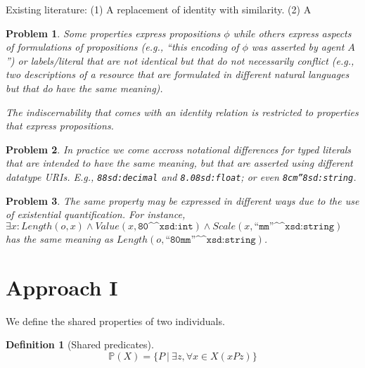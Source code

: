 \documentclass[11pt,a4paper,notitlepage,onecolumn,twoside]{article}
\newtheorem{definition}{Definition}
\newtheorem{problem}{Problem}
\begin{document}
Existing literature:
(1) A replacement of identity with similarity.
(2) A 

\begin{problem}
Some properties express propositions $\phi$ while others express aspects of formulations of propositions (e.g., ``this encoding of $\phi$ was asserted by agent $A$'') or labels/literal that are not identical but that do not necessarily conflict (e.g., two descriptions of a resource that are formulated in different natural languages but that do have the same meaning).

The indiscernability that comes with an identity relation is restricted to properties that express propositions.
\end{problem}

\begin{problem}
In practice we come accross notational differences for typed literals that are intended to have the same meaning, but that are asserted using different datatype URIs. E.g., \texttt{8^^xsd:decimal} and \texttt{8.0^^xsd:float}; or even \texttt{8cm''^^xsd:string}.
\end{problem}

\begin{problem}
The same property may be expressed in different ways due to the use of existential quantification. For instance,
$\exists x: Length(o, x) \land Value(x, \texttt{80^^xsd:int}) \land Scale(x, \texttt{``mm''^^xsd:string})$ has the same meaning as $Length(o, \texttt{``80mm''^^xsd:string})$.
\end{problem}

\section{Approach I}

We define the shared properties of two individuals.

\begin{definition}[Shared predicates]
\label{def:shared_predicates}
\begin{equation}
\mathbb{P}(X) = \{ P \  \vert \  \exists z, \forall x \in X (xPz) \}
\end{equation}
\end{definition}

\begin{comment}
\begin{definition}[Shared predicates]
\label{def:shared_predicates}
\begin{equation}
\mathbb{P}(x,y) = \{ P \in \mathbb{P} \  \vert \  \exists z (xPz \land yPz) \}
\end{equation}
\end{definition}
\end{comment}
\end{document}
